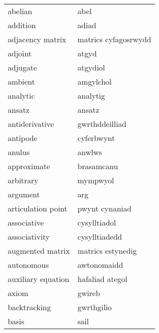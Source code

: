 \begin{supertabular}{p{0.22\textwidth}p{0.22\textwidth}}
                         abelian &                            abel \\
                        addition &                           adiad \\
                adjacency matrix &            matrics cyfagosrwydd \\
                         adjoint &                           atgyd \\
                        adjugate &                        atgydiol \\
                         ambient &                       amgylchol \\
                        analytic &                        analytig \\
                          ansatz &                          ansatz \\
                  antiderivative &                  gwrthddeilliad \\
                        antipode &                      cyferbwynt \\
                          anulus &                          anwlws \\
                     approximate &                      brasamcanu \\
                       arbitrary &                        mympwyol \\
                        argument &                             arg \\
              articulation point &                  pwynt cynaniad \\
                     associative &                    cysylltiadol \\
                   associativity &                   cysylltiadedd \\
                augmented matrix &               matrics estynedig \\
                      autonomous &                     awtonomaidd \\
              auxiliary equation &                 hafaliad ategol \\
                           axiom &                          gwireb \\
                    backtracking &                      gwrthgilio \\
                           basis &                            sail \\

\end{supertabular}
